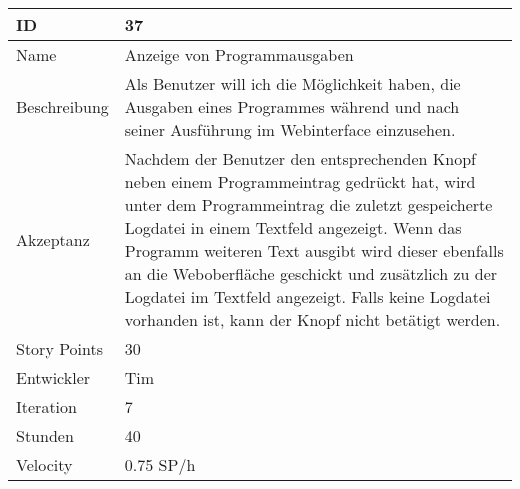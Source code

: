 \begin{table}[htbp]
    \begin{minipage}{\linewidth}
        \setlength{\tymax}{0.5\linewidth}
        \centering
        \small
        \begin{tabulary}{\textwidth}{|l|p{10cm}|} \hline
            ID   &37\\\hline
            Name  &Anzeige von Programmausgaben\\\hline
            Beschreibung&Als Benutzer will ich die Möglichkeit haben, die Ausgaben eines Programmes während und nach seiner Ausführung im Webinterface einzusehen.\\\hline
            Akzeptanz &Nachdem der Benutzer den entsprechenden Knopf neben einem Programmeintrag gedrückt hat, wird unter dem Programmeintrag die zuletzt gespeicherte Logdatei in einem Textfeld angezeigt. Wenn das Programm weiteren Text ausgibt wird dieser ebenfalls an die Weboberfläche geschickt und zusätzlich zu der Logdatei im Textfeld angezeigt. Falls keine Logdatei vorhanden ist, kann der Knopf nicht betätigt werden.\\\hline
            Story Points&30\\\hline
            Entwickler &Tim\\\hline
            Iteration &7\\\hline
            Stunden  &40\\\hline
            Velocity &0.75 SP\slash h\\\hline
        \end{tabulary}
    \end{minipage}
\end{table}




